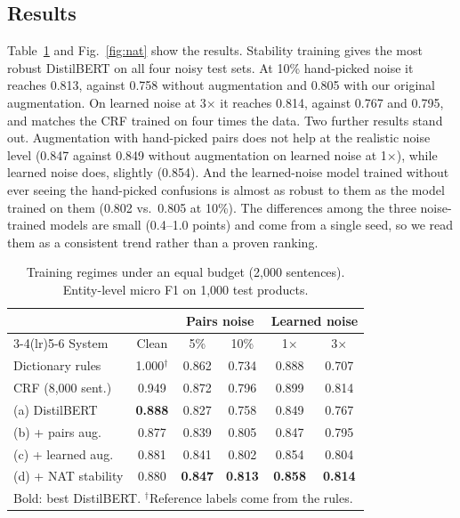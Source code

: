 \documentclass[conference]{IEEEtran}
\begin{document}
\subsection{Results}
Table~\ref{tab:nat} and Fig.~\ref{fig:nat} show the results. Stability training gives the most robust DistilBERT on all four noisy test sets. At 10\% hand-picked noise it reaches 0.813, against 0.758 without augmentation and 0.805 with our original augmentation. On learned noise at 3$\times$ it reaches 0.814, against 0.767 and 0.795, and matches the CRF trained on four times the data. Two further results stand out. Augmentation with hand-picked pairs does not help at the realistic noise level (0.847 against 0.849 without augmentation on learned noise at 1$\times$), while learned noise does, slightly (0.854). And the learned-noise model trained without ever seeing the hand-picked confusions is almost as robust to them as the model trained on them (0.802 vs.\ 0.805 at 10\%). The differences among the three noise-trained models are small (0.4--1.0 points) and come from a single seed, so we read them as a consistent trend rather than a proven ranking.

\begin{table}[t]
\caption{Training regimes under an equal budget (2,000 sentences). Entity-level micro F1 on 1,000 test products.}
\label{tab:nat}
\centering
\footnotesize
\setlength{\tabcolsep}{2.0pt}
\begin{tabular}{lccccc}
\toprule
 & & \multicolumn{2}{c}{Pairs noise} & \multicolumn{2}{c}{Learned noise} \\
\cmidrule(lr){3-4}\cmidrule(lr){5-6}
System & Clean & 5\% & 10\% & 1$\times$ & 3$\times$ \\
\midrule
Dictionary rules & 1.000$^\dagger$ & 0.862 & 0.734 & 0.888 & 0.707 \\
CRF (8,000 sent.) & 0.949 & 0.872 & 0.796 & 0.899 & 0.814 \\
\midrule
(a) DistilBERT & \textbf{0.888} & 0.827 & 0.758 & 0.849 & 0.767 \\
(b) + pairs aug. & 0.877 & 0.839 & 0.805 & 0.847 & 0.795 \\
(c) + learned aug. & 0.881 & 0.841 & 0.802 & 0.854 & 0.804 \\
(d) + NAT stability & 0.880 & \textbf{0.847} & \textbf{0.813} & \textbf{0.858} & \textbf{0.814} \\
\bottomrule
\multicolumn{6}{l}{\scriptsize Bold: best DistilBERT. $^\dagger$Reference labels come from the rules.}
\end{tabular}
\end{table}
\end{document}
